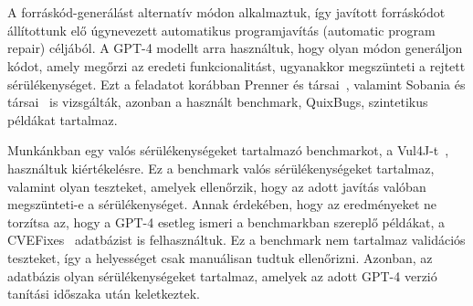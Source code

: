 \documentclass[12pt,a4paper]{extarticle}
\begin{document}
\section{\thesispointthreehu}

A forráskód-generálást alternatív módon alkalmaztuk, így javított forráskódot állítottunk elő úgynevezett automatikus programjavítás (automatic program repair) céljából.
A GPT-4 modellt arra használtuk, hogy olyan módon generáljon kódot, amely megőrzi az eredeti funkcionalitást, ugyanakkor megszünteti a rejtett sérülékenységet.
Ezt a feladatot korábban Prenner és társai~\cite{codex_bug_fix}, valamint Sobania és társai~\cite{quix_bugs_abuser_2} is vizsgálták, azonban a használt benchmark, QuixBugs, szintetikus példákat tartalmaz.


Munkánkban egy valós sérülékenységeket tartalmazó benchmarkot, a Vul4J-t~\cite{vul4j}, hasz\-nál\-tuk kiértékelésre.
Ez a benchmark valós sérülékenységeket tartalmaz, valamint olyan teszteket, amelyek ellenőrzik, hogy az adott javítás valóban megszünteti-e a sé\-rü\-lé\-keny\-sé\-get.
Annak érdekében, hogy az eredményeket ne torzítsa az, hogy a GPT-4 esetleg ismeri a benchmarkban szereplő példákat, a CVEFixes~\cite{bhandari2021cvefixes} adatbázist is felhasználtuk.
Ez a benchmark nem tartalmaz validációs teszteket, így a helyességet csak manuálisan tudtuk ellenőrizni.
Azonban, az adatbázis olyan sérülékenységeket tartalmaz, amelyek az adott GPT-4 verzió tanítási időszaka után keletkeztek.
\end{document}

